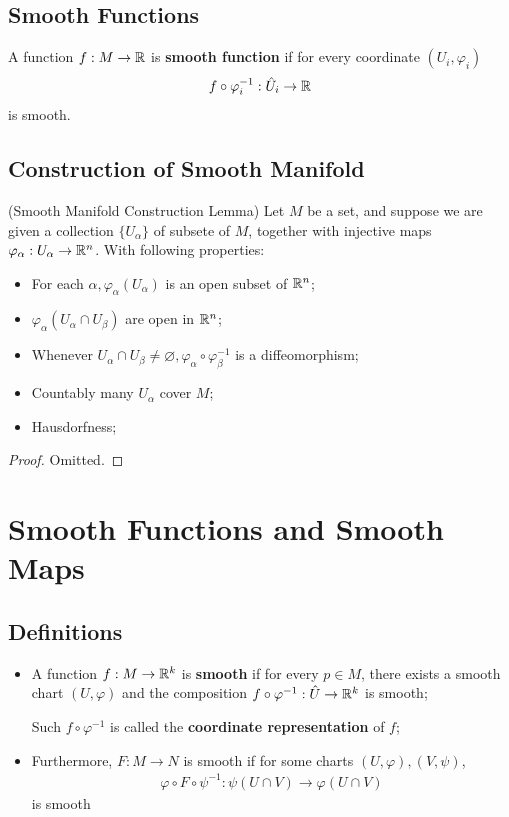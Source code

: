\documentclass[Total.tex]{subfiles}
\begin{document}
			\subsection{Smooth Functions}
			\begin{Def}
				A function $f:M\rightarrow \mathbb{R}$ is \textbf{smooth function} if for every coordinate $(U_i,\varphi_i)$
				\begin{gather*}
					f\circ \varphi_i^{-1}:\hat{U}_i\rightarrow \mathbb{R}
				\end{gather*} 
				is smooth.
			\end{Def}
			\subsection{Construction of Smooth Manifold}
			\begin{lemma}
				(Smooth Manifold Construction Lemma) Let $M$ be a set, and suppose we are given a collection $\{U_\alpha\}$ of subsete of $M$, together with injective maps $\varphi_\alpha:U_\alpha\rightarrow \mathbb{R}^n$. With following properties:
				\begin{itemize}
					\item For each $\alpha,\varphi_\alpha(U_\alpha)$ is an open subset of $\mathbb{R}^n$;
					\item $\varphi_\alpha(U_\alpha\cap U_\beta)$ are open in $\mathbb{R}^n$;
					\item Whenever $U_\alpha\cap U_\beta\not=\varnothing,\varphi_\alpha\circ \varphi_\beta^{-1}$ is a diffeomorphism;
					\item Countably many $U_\alpha$ cover $M$;
					\item Hausdorfness;
				\end{itemize}
			\end{lemma}
			\begin{proof}
				Omitted.
			\end{proof}
		\section{Smooth Functions and Smooth Maps}
			\subsection{Definitions}
			\begin{Def}
				\begin{itemize}
					\item A function $f:M\rightarrow \mathbb{R}^k$ is \textbf{smooth} if for every $p\in M$, there exists a smooth chart $(U,\varphi)$ and the composition $f\circ \varphi^{-1}:\hat{U}\rightarrow \mathbb{R}^k$ is smooth;
					
					Such $f\circ \varphi^{-1}$ is called the \textbf{coordinate representation} of $f$;
					\item Furthermore, $F:M\rightarrow N$ is smooth if for some charts $(U,\varphi),(V,\psi)$,
					\begin{gather*}
						\varphi\circ F\circ \psi^{-1}:\psi(U\cap V)\rightarrow \varphi(U\cap V)
					\end{gather*}
					is smooth
				\end{itemize}
			\end{Def}
			
\end{document}
